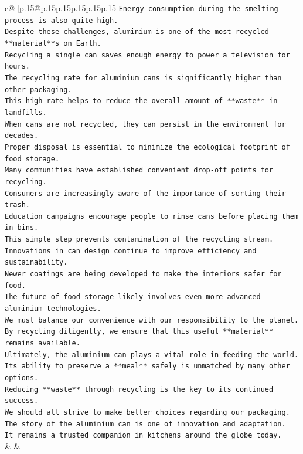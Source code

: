 \documentclass{article}
\begin{document}
{\begin{supertabular}{c@{$\;$}|p{.15\linewidth}@{}p{.15\linewidth}p{.15\linewidth}p{.15\linewidth}p{.15\linewidth}p{.15\linewidth}}
{{{\texttt{Energy consumption during the smelting process is also quite high.} \\
\texttt{Despite these challenges, aluminium is one of the most recycled **material**s on Earth.} \\
\texttt{Recycling a single can saves enough energy to power a television for hours.} \\
\texttt{The recycling rate for aluminium cans is significantly higher than other packaging.} \\
\texttt{This high rate helps to reduce the overall amount of **waste** in landfills.} \\
\texttt{When cans are not recycled, they can persist in the environment for decades.} \\
\texttt{Proper disposal is essential to minimize the ecological footprint of food storage.} \\
\texttt{Many communities have established convenient drop{-}off points for recycling.} \\
\texttt{Consumers are increasingly aware of the importance of sorting their trash.} \\
\texttt{Education campaigns encourage people to rinse cans before placing them in bins.} \\
\texttt{This simple step prevents contamination of the recycling stream.} \\
\texttt{Innovations in can design continue to improve efficiency and sustainability.} \\
\texttt{Newer coatings are being developed to make the interiors safer for food.} \\
\texttt{The future of food storage likely involves even more advanced aluminium technologies.} \\
\texttt{We must balance our convenience with our responsibility to the planet.} \\
\texttt{By recycling diligently, we ensure that this useful **material** remains available.} \\
\texttt{Ultimately, the aluminium can plays a vital role in feeding the world.} \\
\texttt{Its ability to preserve a **meal** safely is unmatched by many other options.} \\
\texttt{Reducing **waste** through recycling is the key to its continued success.} \\
\texttt{We should all strive to make better choices regarding our packaging.} \\
\texttt{The story of the aluminium can is one of innovation and adaptation.} \\
\texttt{It remains a trusted companion in kitchens around the globe today.} \\
            }
        }
    }
    & & \\ \\


\end{supertabular}}
\end{document}
